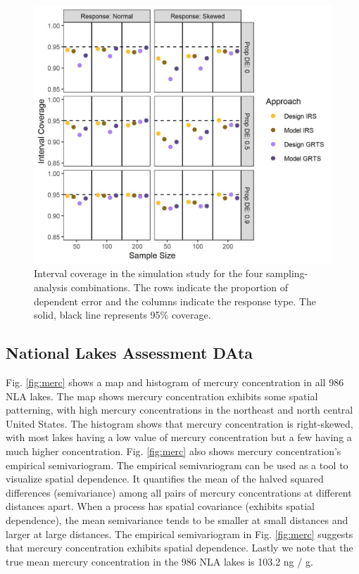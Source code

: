 \documentclass[]{elsarticle} %
\begin{document}
\begin{figure}
  \centering
  \includegraphics[width = 1\linewidth]{figures/coverage.jpeg}
  \caption{Interval coverage in the simulation study for the four sampling-analysis combinations. The rows indicate the proportion of dependent error and the columns indicate the response type. The solid, black line represents 95\% coverage.}
  \label{fig:figconf}
\end{figure}

\hypertarget{sec:r_app}{%
\subsection{National Lakes Assessment DAta}\label{sec:r_app}}

Fig. \ref{fig:merc} shows a map and histogram of mercury concentration
in all 986 NLA lakes. The map shows mercury concentration exhibits some
spatial patterning, with high mercury concentrations in the northeast
and north central United States. The histogram shows that mercury
concentration is right-skewed, with most lakes having a low value of
mercury concentration but a few having a much higher concentration. Fig.
\ref{fig:merc} also shows mercury concentration's empirical
semivariogram. The empirical semivariogram can be used as a tool to
visualize spatial dependence. It quantifies the mean of the halved
squared differences (semivariance) among all pairs of mercury
concentrations at different distances apart. When a process has spatial
covariance (exhibits spatial dependence), the mean semivariance tends to
be smaller at small distances and larger at large distances. The
empirical semivariogram in Fig. \ref{fig:merc} suggests that mercury
concentration exhibits spatial dependence. Lastly we note that the true
mean mercury concentration in the 986 NLA lakes is 103.2 ng / g.
\end{document}
